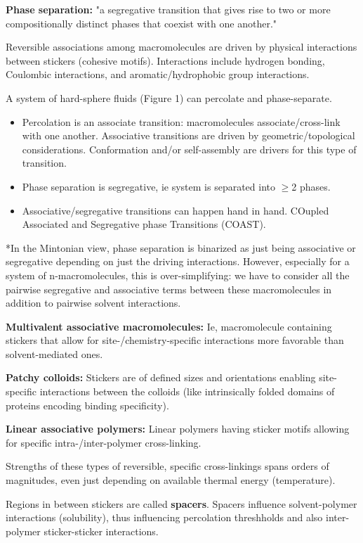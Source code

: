\documentclass{article}
\begin{document}
\textbf{Phase separation: } "a segregative transition that gives rise to two or more compositionally distinct phases that coexist with one another."

Reversible associations among macromolecules are driven by physical interactions between stickers (cohesive motifs). Interactions include hydrogen bonding, Coulombic interactions, and aromatic/hydrophobic group interactions.

A system of hard-sphere fluids (Figure 1) can percolate and phase-separate.

\begin{itemize}
    \item Percolation is an associate transition: macromolecules associate/cross-link with one another. Associative transitions are driven by geometric/topological considerations. Conformation and/or self-assembly are drivers for this type of transition.
    \item Phase separation is segregative, ie system is separated into $\geq$2 phases.
    \item Associative/segregative transitions can happen hand in hand. COupled Associated and Segregative phase Transitions (COAST).
\end{itemize}

*In the Mintonian view, phase separation is binarized as just being associative or segregative depending on just the driving interactions. However, especially for a system of n-macromolecules, this is over-simplifying: we have to consider all the pairwise segregative and associative terms between these macromolecules in addition to pairwise solvent interactions.

\textbf{Multivalent associative macromolecules: } Ie, macromolecule containing stickers that allow for site-/chemistry-specific interactions more favorable than solvent-mediated ones.

\textbf{Patchy colloids: } Stickers are of defined sizes and orientations enabling site-specific interactions between the colloids (like intrinsically folded domains of proteins encoding binding specificity).

\textbf{Linear associative polymers: } Linear polymers having sticker motifs allowing for specific intra-/inter-polymer cross-linking.

Strengths of these types of reversible, specific cross-linkings spans orders of magnitudes, even just depending on available thermal energy (temperature).

Regions in between stickers are called \textbf{spacers}. Spacers influence solvent-polymer interactions (solubility), thus influencing percolation threshholds and also inter-polymer sticker-sticker interactions.
\end{document}
